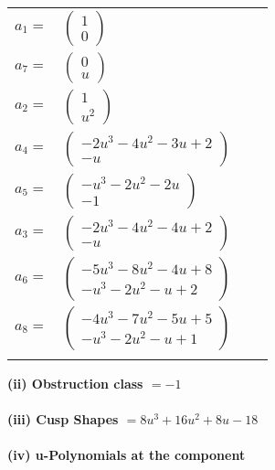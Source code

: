 \documentclass[1p]{elsarticle_modified}
\theoremstyle{definition}
\begin{document}
\begin{tabular}{m{7pt} m{180pt} m{7pt} m{180pt} }
\flushright $a_{1}=$&$\begin{pmatrix}1\\0\end{pmatrix}$ \\
\flushright $a_{7}=$&$\begin{pmatrix}0\\u\end{pmatrix}$ \\
\flushright $a_{2}=$&$\begin{pmatrix}1\\u^2\end{pmatrix}$ \\
\flushright $a_{4}=$&$\begin{pmatrix}-2 u^3-4 u^2-3 u+2\\- u\end{pmatrix}$ \\
\flushright $a_{5}=$&$\begin{pmatrix}- u^3-2 u^2-2 u\\-1\end{pmatrix}$ \\
\flushright $a_{3}=$&$\begin{pmatrix}-2 u^3-4 u^2-4 u+2\\- u\end{pmatrix}$ \\
\flushright $a_{6}=$&$\begin{pmatrix}-5 u^3-8 u^2-4 u+8\\- u^3-2 u^2- u+2\end{pmatrix}$ \\
\flushright $a_{8}=$&$\begin{pmatrix}-4 u^3-7 u^2-5 u+5\\- u^3-2 u^2- u+1\end{pmatrix}$\\&\end{tabular}
\flushleft \textbf{(ii) Obstruction class $= -1$}\\~\\
\flushleft \textbf{(iii) Cusp Shapes $= 8 u^3+16 u^2+8 u-18$}\\~\\
\newpage\renewcommand{\arraystretch}{1}
\flushleft \textbf{(iv) u-Polynomials at the component}\newline \\
\end{document}
